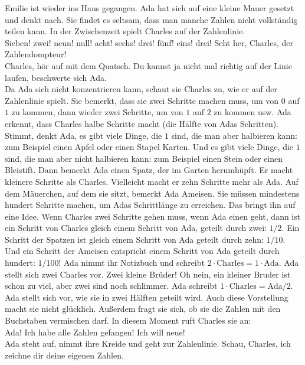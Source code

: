 Emilie ist wieder ins Haus gegangen. 
Ada hat sich auf eine kleine Mauer gesetzt und denkt nach. 
Sie findet es seltsam, dass man manche Zahlen nicht vollständig teilen kann. 
In der Zwischenzeit spielt Charles auf der Zahlenlinie. \\
\frqq{}Sieben! zwei! neun! null! acht! sechs! drei! fünf! eins! drei! Seht her, Charles, der Zahlendompteur!\flqq{}\\
\frqq{}Charles, hör auf mit dem Quatsch. Du kannst ja nicht mal richtig auf der Linie laufen\flqq{}, beschwerte sich Ada.\\
Da Ada sich nicht konzentrieren kann, schaut sie Charles zu, wie er auf der Zahlenlinie spielt. Sie bemerkt, dass sie zwei Schritte machen muss, um von $0$ auf $1$ zu kommen, dann wieder zwei Schritte, um von $1$ auf $2$ zu kommen usw. Ada erkennt, dass Charles halbe Schritte macht (die Hälfte von Adas Schritten). 
Stimmt, denkt Ada, es gibt viele Dinge, die $1$ sind, die man aber halbieren kann: zum Beispiel einen Apfel oder einen Stapel Karten. Und es gibt viele Dinge, die $1$ sind, die man aber nicht halbieren kann: zum Beispiel einen Stein oder einen Bleistift.
Dann bemerkt Ada einen Spatz, der im Garten herumhüpft. Er macht kleinere Schritte als Charles. Vielleicht macht er zehn Schritte mehr als Ada. Auf dem Mäuerchen, auf dem sie sitzt, bemerkt Ada Ameisen. Sie müssen mindestens hundert Schritte machen, um Adas Schrittlänge zu erreichen.
Das bringt ihn auf eine Idee. Wenn Charles zwei Schritte gehen muss, wenn Ada einen geht, dann ist ein Schritt von Charles gleich einem Schritt von Ada, geteilt durch zwei: $1/2$. Ein Schritt der Spatzen ist gleich einem Schritt von Ada geteilt durch zehn: $1/10$. Und ein Schritt der Ameisen entspricht einem Schritt von Ada geteilt durch hundert: $1/100$!
Ada nimmt ihr Notizbuch und schreibt $2 \cdot \mathrm{Charles} = 1 \cdot \mathrm{Ada}$. Ada stellt sich zwei Charles vor. Zwei kleine Brüder! Oh nein, ein kleiner Bruder ist schon zu viel, aber zwei sind noch schlimmer. Ada schreibt $1 \cdot \mathrm{Charles} = \mathrm{Ada} / 2$. Ada stellt sich vor, wie sie in zwei Hälften geteilt wird. Auch diese Vorstellung macht sie nicht glücklich. Außerdem fragt sie sich, ob sie die Zahlen mit den Buchstaben vermischen darf.
In diesem Moment ruft Charles sie an:\\
\frqq{}Ada! Ich habe alle Zahlen gefangen! Ich will neue!\flqq{} \\
Ada steht auf, nimmt ihre Kreide und geht zur Zahlenlinie.
\frqq{}Schau, Charles, ich zeichne dir deine eigenen Zahlen.\flqq{}\\
